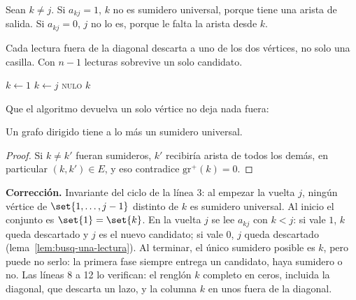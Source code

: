 \documentclass[11pt,letterpaper]{article}
\begin{document}
\begin{lema}
  \label{lem:busq-una-lectura}
  Sean $k \neq j$. Si $a_{kj} = 1$, $k$ no es sumidero universal,
  porque tiene una arista de salida. Si $a_{kj} = 0$, $j$ no lo es,
  porque le falta la arista desde $k$.
\end{lema}

Cada lectura fuera de la diagonal descarta a uno de los dos vértices,
no solo una casilla. Con $n - 1$ lecturas sobrevive un solo candidato.

\begin{algorithm}[H]
\caption{\textsc{Sumidero-Universal}$(A, n)$}
\label{alg:busq-sumidero}
\begin{algorithmic}[1]
  \State $k \gets 1$ 
     
      \State $k \gets j$
    \EndIf
  \EndFor
   
      \State \Return \textsc{nulo}
    \EndIf
  \EndFor
  \State \Return $k$
\EndProcedure
\end{algorithmic}
\end{algorithm}

Que el algoritmo devuelva un solo vértice no deja nada fuera:

\begin{lema}
  Un grafo dirigido tiene a lo más un sumidero universal.
\end{lema}

\begin{proof}
  Si $k \neq k'$ fueran sumideros, $k'$ recibiría arista de todos los
  demás, en particular $(k, k') \in E$, y eso contradice
  $\text{gr}^{+}(k) = 0$.
\end{proof}

\textbf{Corrección.} Invariante del ciclo de la línea 3: al empezar la
vuelta $j$, ningún vértice de $\set{1, \dots, j - 1}$ distinto de $k$
es sumidero universal. Al inicio el conjunto es $\set{1} = \set{k}$.
En la vuelta $j$ se lee $a_{kj}$ con $k < j$: si vale $1$, $k$ queda
descartado y $j$ es el nuevo candidato; si vale $0$, $j$ queda
descartado (lema~\ref{lem:busq-una-lectura}). Al terminar, el único
sumidero posible es $k$, pero puede no serlo: la primera fase siempre
entrega un candidato, haya sumidero o no. Las líneas 8 a 12 lo
verifican: el renglón $k$ completo en ceros, incluida la diagonal, que
descarta un lazo, y la columna $k$ en unos fuera de la diagonal.
\end{document}
